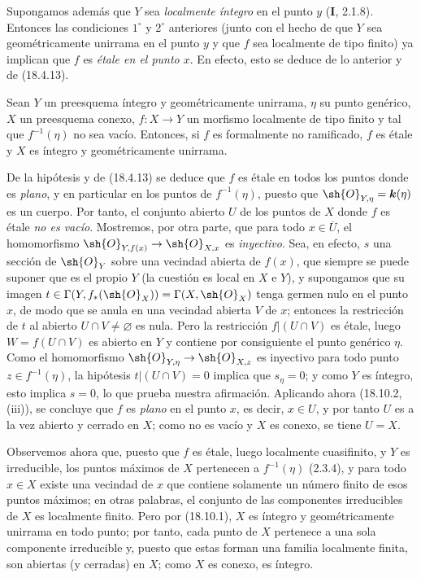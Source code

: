 \begin{remark}[18.10.2]
\begin{enumerate}
Supongamos además que $Y$ sea \emph{localmente íntegro} en el punto $y$ (\textbf I, 2.1.8). Entonces las condiciones $1^\circ$ y $2^\circ$ anteriores (junto con el hecho de que $Y$ sea geométricamente unirrama en el punto $y$ y que $f$ sea localmente de tipo finito) ya implican que $f$ es \emph{étale en el punto $x$}. En efecto, esto se deduce de lo anterior y de (18.4.13).
\end{enumerate}
\end{remark}

\begin{corollary}[18.10.3]
\label{IV.18.10.3}
Sean $Y$ un preesquema íntegro y geométricamente unirrama, $\eta$ su punto genérico, $X$ un preesquema conexo, $f:X\to Y$ un morfismo localmente de tipo finito y tal que $f^{-1}(\eta)$ no sea vacío. Entonces, si $f$ es formalmente no ramificado, $f$ es étale y $X$ es íntegro y geométricamente unirrama.
\end{corollary}

De la hipótesis y de (18.4.13) se deduce que $f$ es étale en todos los puntos donde es \emph{plano}, y en particular en los puntos de $f^{-1}(\eta)$, puesto que $\sh{O}_{Y,\eta}=\boldsymbol{k}(\eta)$ es un cuerpo. Por tanto, el conjunto abierto $U$ de los puntos de $X$ donde $f$ es étale \emph{no es vacío}. Mostremos, por otra parte, que para todo $x\in\overline U$, el homomorfismo $\sh{O}_{Y,f(x)}\to\sh{O}_{X,x}$ es \emph{inyectivo}. Sea, en efecto, $s$ una sección de $\sh{O}_Y$ sobre una vecindad abierta de $f(x)$, que siempre se puede suponer que es el propio $Y$ (la cuestión es local en $X$ e $Y$), y supongamos que su imagen $t\in\Gamma(Y,f_*(\sh{O}_X))=\Gamma(X,\sh{O}_X)$ tenga germen nulo en el punto $x$, de modo que se anula en una vecindad abierta $V$ de $x$; entonces la restricción de $t$ al abierto $U\cap V\neq\varnothing$ es nula. Pero la restricción $f|(U\cap V)$ es étale, luego $W=f(U\cap V)$ es abierto en $Y$ y contiene por consiguiente el punto genérico $\eta$. Como el homomorfismo $\sh{O}_{Y,\eta}\to\sh{O}_{X,z}$ es inyectivo para todo punto $z\in f^{-1}(\eta)$, la hipótesis $t|(U\cap V)=0$ implica que $s_\eta=0$; y como $Y$ es íntegro, esto implica $s=0$, lo que prueba nuestra afirmación. Aplicando ahora (18.10.2, (iii)), se concluye que $f$ es \emph{plano} en el punto $x$, es decir, $x\in U$, y por tanto $U$ es a la vez abierto y cerrado en $X$; como no es vacío y $X$ es conexo, se tiene $U=X$.

Observemos ahora que, puesto que $f$ es étale, luego localmente cuasifinito, y $Y$ es irreducible, los puntos máximos de $X$ pertenecen a $f^{-1}(\eta)$ (2.3.4), y para todo $x\in X$ existe una vecindad de $x$ que contiene solamente un número finito de esos puntos máximos; en otras palabras, el conjunto de las componentes irreducibles de $X$ es localmente finito. Pero por (18.10.1), $X$ es íntegro y geométricamente unirrama en todo punto; por tanto, cada punto de $X$ pertenece a una sola componente irreducible y, puesto que estas forman una familia localmente finita, son abiertas (y cerradas) en $X$; como $X$ es conexo, es íntegro.

